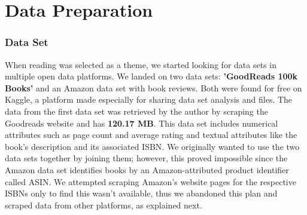 \documentclass[conference]{IEEEtran}
\begin{document}
\part{Data Preparation}

\section{Data Set}
When reading was selected as a theme, we started looking for data sets in multiple open data platforms. We landed on two data sets: \textbf{'GoodReads 100k Books'} \cite{grkaggle} and an Amazon data set with book reviews. Both were found for free on Kaggle, a platform made especially for sharing data set analysis and files. \newline
The data from the first data set was retrieved by the author by scraping the Goodreads website and has \textbf{120.17 MB}. This data set includes numerical attributes such as page count and average rating and textual attributes like the book's description and its associated ISBN.  \newline
We originally wanted to use the two data sets together by joining them; however, this proved impossible since the Amazon data set identifies books by an Amazon-attributed product identifier called ASIN. We attempted scraping Amazon's website pages for the respective ISBNs only to find this wasn't available, thus we abandoned this plan and scraped data from other platforms, as explained next.
\end{document}
